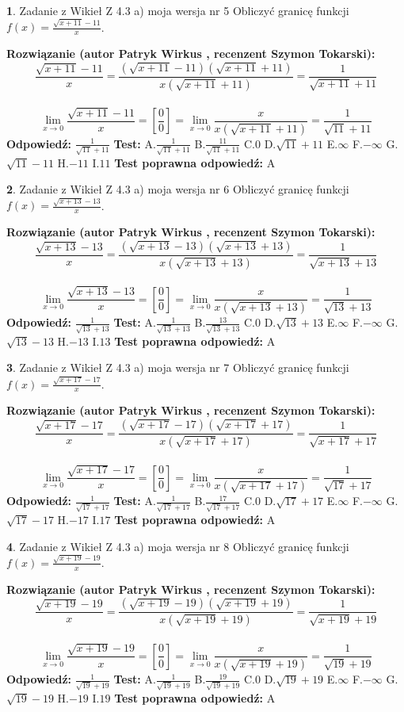 \documentclass[12pt, a4paper]{article}
\theoremstyle{definition} %
\newtheorem{zad}{}
\newcommand{\zadStart}[1]{\begin{zad}#1\newline}
\newcommand{\zadStop}{\end{zad}}
\newcommand{\rozwStart}[2]{\noindent \textbf{Rozwiązanie (autor #1 , recenzent #2): }\newline}
\newcommand{\rozwStop}{\newline}
\newcommand{\odpStart}{\noindent \textbf{Odpowiedź:}\newline}
\newcommand{\odpStop}{\newline}
\newcommand{\testStart}{\noindent \textbf{Test:}\newline}
\newcommand{\testStop}{\newline}
\newcommand{\kluczStart}{\noindent \textbf{Test poprawna odpowiedź:}\newline}
\newcommand{\kluczStop}{\newline}
\begin{document}
\zadStart{Zadanie z Wikieł Z 4.3 a) moja wersja nr 5}
Obliczyć granicę funkcji $f(x)=\frac{\sqrt{x+11}-11}{x}$.
\zadStop
\rozwStart{Patryk Wirkus}{Szymon Tokarski}
$$\frac{\sqrt{x+11}-11}{x}=\frac{(\sqrt{x+11}-11)(\sqrt{x+11}+11)}{x(\sqrt{x+11}+11)}=\frac{1}{\sqrt{x+11}+11}$$
\\
$$\lim\limits_{x\to0}\frac{\sqrt{x+11}-11}{x}=[\frac{0}{0}]=
\lim\limits_{x\to0}\frac{x}{x(\sqrt{x+11}+11)} = \frac{1}{\sqrt{11}+11}$$
\rozwStop
\odpStart
$\frac{1}{\sqrt{11}+11}$
\odpStop
\testStart
A.$\frac{1}{\sqrt{11}+11}$
B.$\frac{11}{\sqrt{11}+11}$
C.$0$
D.$\sqrt{11}+11$
E.$\infty$
F.$-\infty$
G.$\sqrt{11}-11$
H.$-11$
I.$11$
\testStop
\kluczStart
A
\kluczStop



\zadStart{Zadanie z Wikieł Z 4.3 a) moja wersja nr 6}
Obliczyć granicę funkcji $f(x)=\frac{\sqrt{x+13}-13}{x}$.
\zadStop
\rozwStart{Patryk Wirkus}{Szymon Tokarski}
$$\frac{\sqrt{x+13}-13}{x}=\frac{(\sqrt{x+13}-13)(\sqrt{x+13}+13)}{x(\sqrt{x+13}+13)}=\frac{1}{\sqrt{x+13}+13}$$
\\
$$\lim\limits_{x\to0}\frac{\sqrt{x+13}-13}{x}=[\frac{0}{0}]=
\lim\limits_{x\to0}\frac{x}{x(\sqrt{x+13}+13)} = \frac{1}{\sqrt{13}+13}$$
\rozwStop
\odpStart
$\frac{1}{\sqrt{13}+13}$
\odpStop
\testStart
A.$\frac{1}{\sqrt{13}+13}$
B.$\frac{13}{\sqrt{13}+13}$
C.$0$
D.$\sqrt{13}+13$
E.$\infty$
F.$-\infty$
G.$\sqrt{13}-13$
H.$-13$
I.$13$
\testStop
\kluczStart
A
\kluczStop



\zadStart{Zadanie z Wikieł Z 4.3 a) moja wersja nr 7}
Obliczyć granicę funkcji $f(x)=\frac{\sqrt{x+17}-17}{x}$.
\zadStop
\rozwStart{Patryk Wirkus}{Szymon Tokarski}
$$\frac{\sqrt{x+17}-17}{x}=\frac{(\sqrt{x+17}-17)(\sqrt{x+17}+17)}{x(\sqrt{x+17}+17)}=\frac{1}{\sqrt{x+17}+17}$$
\\
$$\lim\limits_{x\to0}\frac{\sqrt{x+17}-17}{x}=[\frac{0}{0}]=
\lim\limits_{x\to0}\frac{x}{x(\sqrt{x+17}+17)} = \frac{1}{\sqrt{17}+17}$$
\rozwStop
\odpStart
$\frac{1}{\sqrt{17}+17}$
\odpStop
\testStart
A.$\frac{1}{\sqrt{17}+17}$
B.$\frac{17}{\sqrt{17}+17}$
C.$0$
D.$\sqrt{17}+17$
E.$\infty$
F.$-\infty$
G.$\sqrt{17}-17$
H.$-17$
I.$17$
\testStop
\kluczStart
A
\kluczStop



\zadStart{Zadanie z Wikieł Z 4.3 a) moja wersja nr 8}
Obliczyć granicę funkcji $f(x)=\frac{\sqrt{x+19}-19}{x}$.
\zadStop
\rozwStart{Patryk Wirkus}{Szymon Tokarski}
$$\frac{\sqrt{x+19}-19}{x}=\frac{(\sqrt{x+19}-19)(\sqrt{x+19}+19)}{x(\sqrt{x+19}+19)}=\frac{1}{\sqrt{x+19}+19}$$
\\
$$\lim\limits_{x\to0}\frac{\sqrt{x+19}-19}{x}=[\frac{0}{0}]=
\lim\limits_{x\to0}\frac{x}{x(\sqrt{x+19}+19)} = \frac{1}{\sqrt{19}+19}$$
\rozwStop
\odpStart
$\frac{1}{\sqrt{19}+19}$
\odpStop
\testStart
A.$\frac{1}{\sqrt{19}+19}$
B.$\frac{19}{\sqrt{19}+19}$
C.$0$
D.$\sqrt{19}+19$
E.$\infty$
F.$-\infty$
G.$\sqrt{19}-19$
H.$-19$
I.$19$
\testStop
\kluczStart
A
\kluczStop
\end{document}
